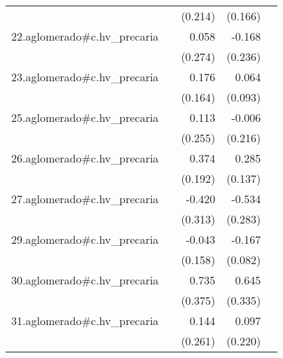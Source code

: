 {\begin{longtable}{l*{4}{D{.}{.}{-1}}}
            &                     &     (0.214)         &     (0.166)         &                     \\
\addlinespace
22.aglomerado#c.hv\_precaria&                     &       0.058         &      -0.168         &                     \\
            &                     &     (0.274)         &     (0.236)         &                     \\
\addlinespace
23.aglomerado#c.hv\_precaria&                     &       0.176         &       0.064         &                     \\
            &                     &     (0.164)         &     (0.093)         &                     \\
\addlinespace
25.aglomerado#c.hv\_precaria&                     &       0.113         &      -0.006         &                     \\
            &                     &     (0.255)         &     (0.216)         &                     \\
\addlinespace
26.aglomerado#c.hv\_precaria&                     &       0.374         &       0.285\sym{*}  &                     \\
            &                     &     (0.192)         &     (0.137)         &                     \\
\addlinespace
27.aglomerado#c.hv\_precaria&                     &      -0.420         &      -0.534         &                     \\
            &                     &     (0.313)         &     (0.283)         &                     \\
\addlinespace
29.aglomerado#c.hv\_precaria&                     &      -0.043         &      -0.167\sym{*}  &                     \\
            &                     &     (0.158)         &     (0.082)         &                     \\
\addlinespace
30.aglomerado#c.hv\_precaria&                     &       0.735         &       0.645         &                     \\
            &                     &     (0.375)         &     (0.335)         &                     \\
\addlinespace
31.aglomerado#c.hv\_precaria&                     &       0.144         &       0.097         &                     \\
            &                     &     (0.261)         &     (0.220)         &                     \\

\end{longtable}}
